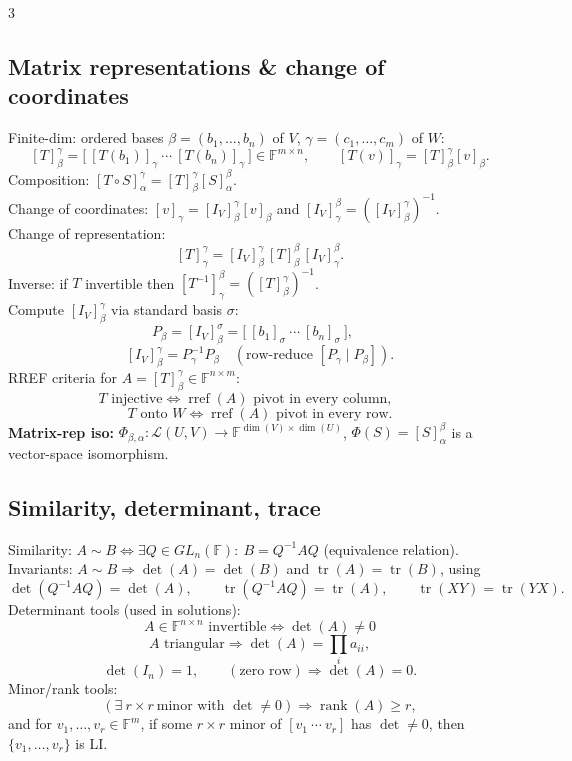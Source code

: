 \documentclass[10pt]{article}
\newcommand{\F}{\mathbb{F}}
\newcommand{\rank}{\operatorname{rank}}
\newcommand{\tr}{\operatorname{tr}}
\begin{document}
\begin{multicols}{3}
\subsection*{Matrix representations \& change of coordinates}
Finite-dim: ordered bases $\beta=(b_1,\dots,b_n)$ of $V$, $\gamma=(c_1,\dots,c_m)$ of $W$:
\[
[T]^{\gamma}_{\beta}=\bigl[\ [T(b_1)]_{\gamma}\ \cdots\ [T(b_n)]_{\gamma}\ \bigr]\in\F^{m\times n},
\qquad
[T(v)]_{\gamma}=[T]^{\gamma}_{\beta}[v]_{\beta}.
\]
Composition: $[T\circ S]^{\gamma}_{\alpha}=[T]^{\gamma}_{\beta}[S]^{\beta}_{\alpha}$.\\
Change of coordinates: $[v]_{\gamma}=[I_V]^{\gamma}_{\beta}[v]_{\beta}$ and $[I_V]^{\beta}_{\gamma}=([I_V]^{\gamma}_{\beta})^{-1}$.\\
Change of representation:
\[
[T]^{\gamma}_{\gamma}=[I_V]^{\gamma}_{\beta}\,[T]^{\beta}_{\beta}\,[I_V]^{\beta}_{\gamma}.
\]
Inverse: if $T$ invertible then $[T^{-1}]^{\beta}_{\gamma}=([T]^{\gamma}_{\beta})^{-1}$.\\
Compute $[I_V]^{\gamma}_{\beta}$ via standard basis $\sigma$:
\[
P_{\beta}=[I_V]^{\sigma}_{\beta}=\bigl[\ [b_1]_{\sigma}\ \cdots\ [b_n]_{\sigma}\ \bigr],\quad
\]
\[
[I_V]^{\gamma}_{\beta}=P_{\gamma}^{-1}P_{\beta}\quad(\text{row-reduce }[P_{\gamma}\mid P_{\beta}]).
\]
RREF criteria for $A=[T]^{\gamma}_{\beta}\in\F^{n\times m}$:
\[
T\text{ injective}\iff \operatorname{rref}(A)\text{ pivot in every column},\qquad
\]
\[
T\text{ onto }W\iff \operatorname{rref}(A)\text{ pivot in every row}.
\]
\textbf{Matrix-rep iso:} $\Phi_{\beta,\alpha}:\mathcal{L}(U,V)\to \F^{\dim(V)\times\dim(U)}$, $\Phi(S)=[S]^{\beta}_{\alpha}$ is a vector-space isomorphism.

\subsection*{Similarity, determinant, trace}
Similarity: $A\sim B\iff \exists Q\in GL_n(\F):\ B=Q^{-1}AQ$ (equivalence relation).\\
Invariants: $A\sim B\Rightarrow \det(A)=\det(B)$ and $\tr(A)=\tr(B)$, using
\[
\det(Q^{-1}AQ)=\det(A),\qquad \tr(Q^{-1}AQ)=\tr(A),\qquad \tr(XY)=\tr(YX).
\]
Determinant tools (used in solutions):
\[
A\in\F^{n\times n}\text{ invertible}\iff \det(A)\neq 0
\]
\[
A\text{ triangular}\Rightarrow \det(A)=\prod_i a_{ii},
\]
\[
\det(I_n)=1,\qquad (\text{zero row})\Rightarrow \det(A)=0.
\]
Minor/rank tools:
\[
(\exists\ r\times r\ \text{minor with }\det\neq 0)\Rightarrow \rank(A)\ge r,
\]
and for $v_1,\dots,v_r\in\F^m$, if some $r\times r$ minor of $[v_1\ \cdots\ v_r]$ has $\det\neq 0$, then $\{v_1,\dots,v_r\}$ is LI.


\end{multicols}
\end{document}
